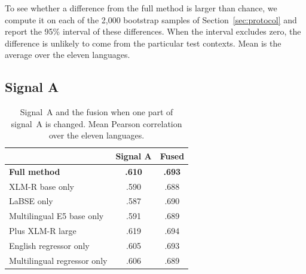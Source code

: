 To see whether a difference from the full method is larger than chance, we compute it on each of %
the 2{,}000 bootstrap samples of Section~\ref{sec:protocol} and report the 95\% interval of these
differences. When the interval excludes zero, the difference is unlikely to come from the particular
test contexts. Mean is the average over the eleven languages.

\subsection{Signal A}
\label{sec:results-a}

\begin{table}[t]
\centering
\small
\setlength{\tabcolsep}{2.5pt}
\begin{tabular}{lcc}
\toprule
 & Signal A & Fused \\
\midrule
\textbf{Full method}              & \textbf{.610} & \textbf{.693} \\ %
\midrule
XLM-R base only                   & .590 & .688 \\ %
LaBSE only                        & .587 & .690 \\ %
Multilingual E5 base only         & .591 & .689 \\ %
Plus XLM-R large                  & .619 & .694 \\ %
\midrule
English regressor only            & .605 & .693 \\ %
Multilingual regressor only       & .606 & .689 \\ %
\bottomrule
\end{tabular}
\caption{Signal~A and the fusion when one part of signal~A is changed. Mean Pearson correlation
over the eleven languages.}
\label{tab:signal-a}
\end{table}

